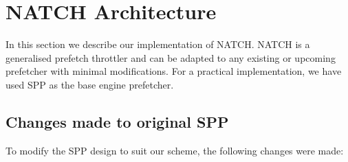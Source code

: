 \section{NATCH Architecture}
\label{Design}

In this section we describe our implementation of NATCH.
NATCH is a generalised prefetch throttler and can be adapted to 
any existing or upcoming prefetcher with minimal modifications.
For a practical implementation, we have used SPP as the base engine prefetcher.

\subsection{Changes made to original SPP}
\label{Design-Changes}
To modify the SPP design to suit our scheme, the following changes were made:

